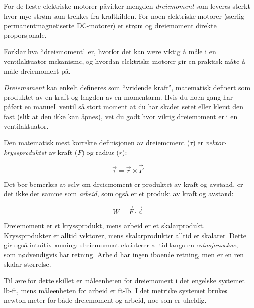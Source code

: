 

For de fleste elektriske motorer påvirker mengden {\it dreiemoment} som leveres sterkt hvor mye strøm som trekkes fra kraftkilden. For noen elektriske motorer (særlig permanentmagnetiserte DC-motorer) er strøm og dreiemoment direkte proporsjonale.

Forklar hva ``dreiemoment'' er, hvorfor det kan være viktig å måle i en ventilaktuator-mekanisme, og hvordan elektriske motorer gir en praktisk måte å måle dreiemoment på.







{\it Dreiemoment} kan enkelt defineres som ``vridende kraft'', matematisk definert som produktet av en kraft og lengden av en momentarm. Hvis du noen gang har påført en manuell ventil så stort moment at du har skadet setet eller klemt den fast (slik at den ikke kan åpnes), vet du godt hvor viktig dreiemoment er i en ventilaktuator.

\vskip 10pt

Den matematisk mest korrekte definisjonen av dreiemoment ($\tau$) er {\it vektor-kryssproduktet} av kraft ($F$) og radius ($r$):

$$\vec \tau = \vec r \times \vec F$$







Det bør bemerkes at selv om dreiemoment er produktet av kraft og avstand, er det ikke det samme som {\it arbeid}, som også er et produkt av kraft og avstand:

$$W = \vec F \cdot \vec d$$

Dreiemoment er et kryssprodukt, mens arbeid er et skalarprodukt. Kryssprodukter er alltid vektorer, mens skalarprodukter alltid er skalarer. Dette gir også intuitiv mening: dreiemoment eksisterer alltid langs en {\it rotasjonsakse}, som nødvendigvis har retning. Arbeid har ingen iboende retning, men er en ren skalar størrelse.

Til ære for dette skillet er måleenheten for dreiemoment i det engelske systemet lb-ft, mens måleenheten for arbeid er ft-lb. I det metriske systemet brukes newton-meter for både dreiemoment og arbeid, noe som er uheldig.



